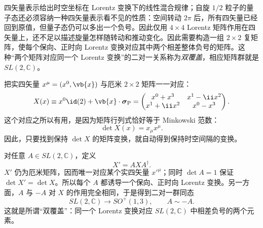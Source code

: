 四矢量表示给出时空坐标在 Lorentz 变换下的线性混合规律；自旋 $1/2$ 粒子的量子态还必须容纳一种四矢量表示看不见的性质：空间转动 $2\pi$ 后，所有四矢量已经回到原值，但量子态仍可以多出一个负号。因此仅用 $4\times4$ Lorentz 矩阵作用在四矢量上，还不足以描述旋量怎样随转动和推动变化。因此需要构造一组 $2\times2$ 复矩阵，使每个保向、正时向 Lorentz 变换对应其中两个相差整体负号的矩阵。这种“两个矩阵对应同一个 Lorentz 变换”的二对一关系称为\emph{双覆盖}，相应矩阵群就是 $SL(2,\mathbb C)$。


把实四矢量 $x^\mu=(x^0,\vb{x})$ 与厄米 $2\times2$ 矩阵一一对应：
\begin{equation}
 X(x)\equiv x^0\id(2)+\vb{x}\cdot\boldsymbol\sigma_{\rm P}
 =\begin{pmatrix}
 x^0+x^3 & x^1-\ii x^2\\
 x^1+\ii x^2 & x^0-x^3
 \end{pmatrix}.
 \label{eq:sl2c-hermitian-map-dp8}
\end{equation}
这个对应之所以有用，是因为矩阵行列式恰好等于 Minkowski 范数：
\begin{equation}
 {\det X(x)=x_\mu x^\mu.}
 \label{eq:sl2c-det-minkowski-dp8}
\end{equation}
因此，只要找到保持 $\det X$ 的矩阵变换，就自动得到保持时空间隔的变换。

对任意 $A\in SL(2,\mathbb C)$，定义
\begin{equation}
 X' = A X A^\dagger.
 \label{eq:sl2c-action-X-dp8}
\end{equation}
$X'$ 仍为厄米矩阵，因而唯一对应某个实四矢量 $x'^\mu$；同时 $\det A=1$ 保证 $\det X'=\det X$。所以每个 $A$ 都诱导一个保向、正时向 Lorentz 变换。另一方面，$A$ 与 $-A$ 对 $X$ 的作用完全相同，于是得到二对一群同态
\begin{equation}
 {SL(2,\mathbb C)\longrightarrow SO^+(1,3),\qquad A\sim -A.}
 \label{eq:sl2c-double-cover-dp8}
\end{equation}
这就是所谓“双覆盖”：同一个 Lorentz 变换对应 $SL(2,\mathbb C)$ 中相差负号的两个元素。

